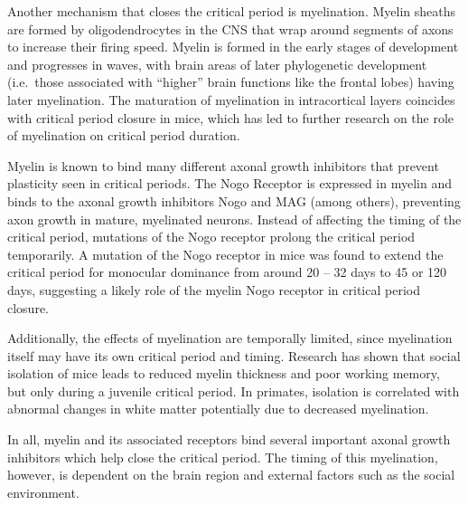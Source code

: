 Another mechanism that closes the critical period is myelination. Myelin sheaths are formed by oligodendrocytes in the CNS that wrap around segments of axons to increase their firing speed. Myelin is formed in the early stages of development and progresses in waves, with brain areas of later phylogenetic development (i.e.~those associated with ``higher'' brain functions like the frontal lobes) having later myelination. The maturation of myelination in intracortical layers coincides with critical period closure in mice, which has led to further research on the role of myelination on critical period duration.

Myelin is known to bind many different axonal growth inhibitors that prevent plasticity seen in critical periods. The Nogo Receptor is expressed in myelin and binds to the axonal growth inhibitors Nogo and MAG (among others), preventing axon growth in mature, myelinated neurons. Instead of affecting the timing of the critical period, mutations of the Nogo receptor prolong the critical period temporarily. A mutation of the Nogo receptor in mice was found to extend the critical period for monocular dominance from around 20 -- 32 days to 45 or 120 days, suggesting a likely role of the myelin Nogo receptor in critical period closure.

Additionally, the effects of myelination are temporally limited, since myelination itself may have its own critical period and timing. Research has shown that social isolation of mice leads to reduced myelin thickness and poor working memory, but only during a juvenile critical period. In primates, isolation is correlated with abnormal changes in white matter potentially due to decreased myelination.

In all, myelin and its associated receptors bind several important axonal growth inhibitors which help close the critical period. The timing of this myelination, however, is dependent on the brain region and external factors such as the social environment.

